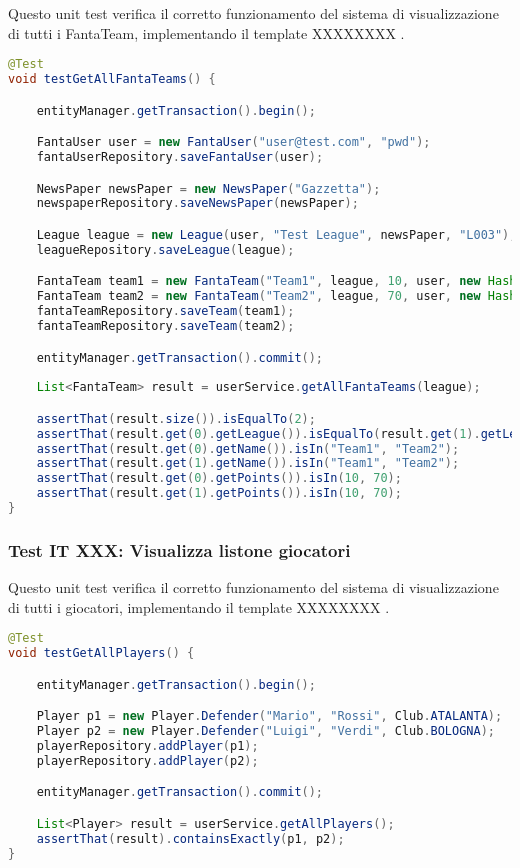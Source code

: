 Questo unit test verifica il corretto funzionamento del sistema di visualizzazione di tutti i FantaTeam,
implementando il template XXXXXXXX .

\begin{lstlisting}[language=Java]
@Test
void testGetAllFantaTeams() {

	entityManager.getTransaction().begin();

	FantaUser user = new FantaUser("user@test.com", "pwd");
	fantaUserRepository.saveFantaUser(user);

	NewsPaper newsPaper = new NewsPaper("Gazzetta");
	newspaperRepository.saveNewsPaper(newsPaper);

	League league = new League(user, "Test League", newsPaper, "L003");
	leagueRepository.saveLeague(league);

	FantaTeam team1 = new FantaTeam("Team1", league, 10, user, new HashSet<>());
	FantaTeam team2 = new FantaTeam("Team2", league, 70, user, new HashSet<>());
	fantaTeamRepository.saveTeam(team1);
	fantaTeamRepository.saveTeam(team2);

	entityManager.getTransaction().commit();
		
	List<FantaTeam> result = userService.getAllFantaTeams(league);

	assertThat(result.size()).isEqualTo(2);
	assertThat(result.get(0).getLeague()).isEqualTo(result.get(1).getLeague());
	assertThat(result.get(0).getName()).isIn("Team1", "Team2");
	assertThat(result.get(1).getName()).isIn("Team1", "Team2");
	assertThat(result.get(0).getPoints()).isIn(10, 70);
	assertThat(result.get(1).getPoints()).isIn(10, 70);
}
\end{lstlisting}


\subsubsection{Test IT XXX: Visualizza listone giocatori}

Questo unit test verifica il corretto funzionamento del sistema di visualizzazione di tutti i giocatori,
implementando il template XXXXXXXX .

\begin{lstlisting}[language=Java]
@Test
void testGetAllPlayers() {

	entityManager.getTransaction().begin();

	Player p1 = new Player.Defender("Mario", "Rossi", Club.ATALANTA);
	Player p2 = new Player.Defender("Luigi", "Verdi", Club.BOLOGNA);
	playerRepository.addPlayer(p1);
	playerRepository.addPlayer(p2);

	entityManager.getTransaction().commit();

	List<Player> result = userService.getAllPlayers();
	assertThat(result).containsExactly(p1, p2);
}
\end{lstlisting}


